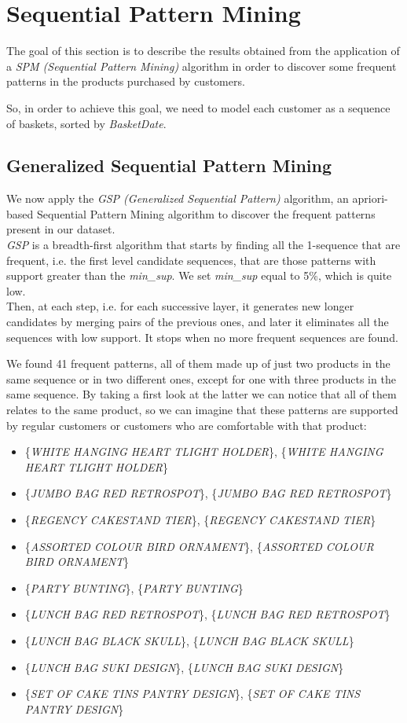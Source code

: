 \section{Sequential Pattern Mining}
The goal of this section is to describe the results obtained from the application of a \emph{SPM (Sequential Pattern Mining)} algorithm in order to discover some frequent patterns in the products purchased by customers.

So, in order to achieve this goal, we need to model each customer as a sequence of baskets, sorted by \emph{BasketDate}.

\subsection{Generalized Sequential Pattern Mining}
We now apply the \emph{GSP (Generalized Sequential Pattern)} algorithm, an apriori-based Sequential Pattern Mining algorithm to discover the frequent patterns present in our dataset.\\
\emph{GSP} is a breadth-first algorithm that starts by finding all the 1-sequence that are frequent, i.e. the first level candidate sequences, that are those patterns with support greater than the \emph{min\_sup}. We set \emph{min\_sup} equal to 5\%, which is quite low.\\
Then, at each step, i.e. for each successive layer, it generates new longer candidates by merging pairs of the previous ones, and later it eliminates all the sequences with low support. It stops when no more frequent sequences are found.

We found 41 frequent patterns, all of them made up of just two products in the same sequence or in two different ones, except for one with three products in the same sequence. By taking a first look at the latter we can notice that all of them relates to the same product, so we can imagine that these patterns are supported by regular customers or customers who are comfortable with that product:

\begin{itemize}
\item \{\emph{WHITE HANGING HEART TLIGHT HOLDER}\}, \{\emph{WHITE HANGING HEART TLIGHT HOLDER}\}
\item \{\emph{JUMBO BAG RED RETROSPOT}\}, \{\emph{JUMBO BAG RED RETROSPOT}\}
\item \{\emph{REGENCY CAKESTAND TIER}\}, \{\emph{REGENCY CAKESTAND TIER}\}
\item \{\emph{ASSORTED COLOUR BIRD ORNAMENT}\}, \{\emph{ASSORTED COLOUR BIRD ORNAMENT}\}
\item \{\emph{PARTY BUNTING}\}, \{\emph{PARTY BUNTING}\}
\item \{\emph{LUNCH BAG RED RETROSPOT}\}, \{\emph{LUNCH BAG RED RETROSPOT}\}
\item \{\emph{LUNCH BAG BLACK SKULL}\}, \{\emph{LUNCH BAG BLACK SKULL}\}
\item \{\emph{LUNCH BAG SUKI DESIGN}\}, \{\emph{LUNCH BAG SUKI DESIGN}\}
\item \{\emph{SET OF CAKE TINS PANTRY DESIGN}\}, \{\emph{SET OF CAKE TINS PANTRY DESIGN}\}
\end{itemize}

